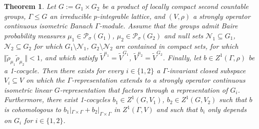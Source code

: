 \documentclass[a4paper,11pt,reqno]{amsart}
\numberwithin{equation}{section}
\newtheorem{theorem}{Theorem}[section]
\theoremstyle{definition}
\theoremstyle{remark}
\theoremstyle{remark}
\begin{document}
\begin{theorem} \label{NowakSuperrigidity} Let $G:=G_{1}\times G_{2}$ be a product of locally compact second countable groups, $\Gamma\leq G$ an irreducible $p$-integrable lattice, and $(V,\rho)$ a strongly operator continuous isometric Banach $\Gamma$-module. Assume that the groups admit Baire probability measures $\mu_{1}\in\mathcal{P}_{\sigma}(G_{1})$, $\mu_{2}\in\mathcal{P}_{\sigma}(G_{2})$ and null sets $\mathcal{N}_{1}\subseteq G_{1}$, $\mathcal{N}_{2}\subseteq G_{2}$ for which $G_{1}\setminus\mathcal{N}_{1}$, $G_{2}\setminus\mathcal{N}_{2}$ are contained in compact sets, for which $\Vert\widetilde{\rho}_{\mu_{1}}\widetilde{\rho}_{\mu_{2}}\Vert<1$, and which satisfy $\widetilde{V}^{\mu_{1}}=\widetilde{V}^{G_{1}}$, $\widetilde{V}^{\mu_{2}}=\widetilde{V}^{G_{2}}$. Finally, let $b\in Z^{1}(\Gamma,\rho)$ be a 1-cocycle. Then there exists for every $i\in\{1,2\}$ a $\Gamma$-invariant closed subspace $V_{i}\subseteq V$ on which the $\Gamma$-representation extends to a strongly operator continuous isometric linear $G$-representation that factors through a representation of $G_{i}$. Furthermore, there exist 1-cocycles $b_{1}\in Z^{1}(G,V_{1})$, $b_{2}\in Z^{1}(G,V_{2})$ such that $b$ is cohomologous to $b_{1}|_{\Gamma \times \Gamma}+b_{2}|_{\Gamma \times \Gamma}$ in $Z^{1}(\Gamma,V)$ and such that $b_{i}$ only depends on $G_{i}$ for $i\in\{1,2\}$. \end{theorem}
\end{document}
